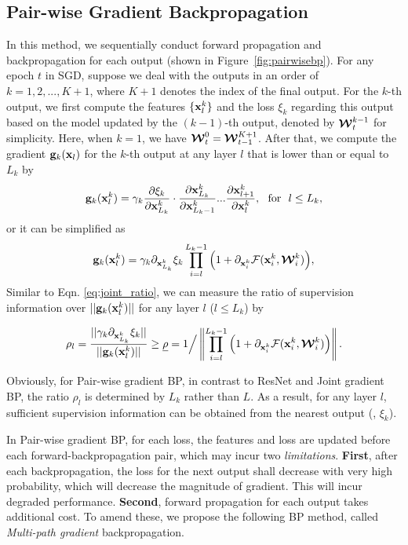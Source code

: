 \documentclass[10pt,onecolumn,letterpaper]{article}
\def\mF{{\mathcal F}}
\def\bmW{\mbox{\boldmath${\mathcal W}$}}
\def\bg{{\bf g}}
\def\bx{{\bf x}}
\begin{document}
\subsection{Pair-wise Gradient Backpropagation}
In this method, we sequentially conduct forward propagation and backpropagation for each output (shown in Figure~\ref{fig:pairwisebp}).  For any epoch $t$ in SGD, suppose we deal with the outputs in an order of $k = 1, 2, ..., K+1$, where $K+1$ denotes the index of the final output. For the $k$-th output, we first compute the features $\{\bx^{k}_l\}$ and the loss $\xi_k$ regarding this output based on the model updated by the $(k-1)$-th output, denoted by $\bmW_t^{k-1}$ for simplicity.  {Here, when $k=1$, we have $\bmW_t^{0} = \bmW_{t-1}^{K+1}$.} After that, we compute the gradient $\bg_k(\bx_l)$ for the $k$-th output
at any layer $l$ that is lower than or equal to $L_k$ by
\begin{equation}\label{eq:pair-wise_gradient}
\bg_k(\bx^{k}_{l}) = \gamma_k \frac{\partial \xi_k }{ \partial \bx^{k}_{L_k} }  \cdot \frac{\partial \bx^{k}_{L_k} }{ \partial \bx^{k}_{L_k-1} }  ...\frac{\partial  \bx^{k}_{l+1}  }{\partial \bx^{k}_{l} }, ~~\mathrm{for}~~ l\leq L_k,
\end{equation}
or it can be simplified as
\begin{equation}\label{eq:pair-wise-grad}
\bg_k(\bx^{k}_{l}) = \gamma_k {\partial_{\bx_{L_k}^k} \xi_k }  \prod\limits_{i = l}^{L_k - 1} \Big( {1 + \partial_{\bx_i^k}  {\mF({\bx_i^k},{{\bmW}_i^k})}} \Big),
\end{equation}
Similar to Eqn. \ref{eq:joint_ratio}, we can measure the ratio of supervision information over $||\bg_k(\bx^{k}_{l})||$ for any layer $l$ ($l\leq L_k$) by
\begin{small}
$$\rho_l = \frac{||\gamma_k{\partial_{\bx_{L_k}^k} \xi_k }||}{||\bg_k(\bx^{k}_{l})||} \geq \underline{\rho} =  1 \Big/ \left\|\prod\limits_{i = l}^{L_k - 1} \Big( {1 + \partial_{\bx_i^k}  {\mF({\bx_i^k},{{\bmW}_i^k})}} \Big)\right\|.$$\end{small}
 Obviously, for Pair-wise gradient BP, in contrast to ResNet and Joint gradient BP, the ratio $\rho_l$ is determined by $L_k$ rather than $L$. As a result, for any layer $l$, sufficient supervision information can be obtained from the nearest output (\ie, $\xi_k$).


In Pair-wise gradient BP, for each loss,
{the features and loss are updated before each forward-backpropagation pair, which may incur two \emph{limitations}.}
\textbf{First}, after each backpropagation, the loss for the next output shall decrease with very high probability, which will decrease the magnitude of gradient. This will incur degraded performance. \textbf{Second}, forward propagation for each output takes additional cost. To amend these, we propose the following BP method, called \emph{Multi-path gradient} backpropagation.
\end{document}
